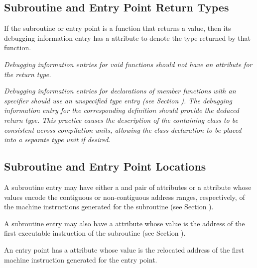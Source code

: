 \subsection{Subroutine and Entry Point Return Types}
\label{chap:subroutineandentrypointreturntypes}

If\hypertarget{chap:DWATtypetypeofsubroutinereturn}{}
the subroutine or entry point
is a function that returns a
value, then its debugging information entry has
a \DWATtypeDEFN{} attribute
to denote the type returned by that function.

\textit{Debugging information entries for
 void functions should
not have an attribute for the return type.  }

\textit{Debugging information entries for declarations of 
member functions with an
\autoreturntype{} specifier should use an unspecified type entry (see
Section ).
The debugging information entry for the corresponding definition
should provide the deduced return type.  This practice causes the description of
the containing class to be consistent across compilation units, allowing the class
declaration to be placed into a separate type unit if desired.}


\subsection{Subroutine and Entry Point Locations}
\label{chap:subroutineandentrypointlocations}

A subroutine entry may have either a \DWATlowpc{} and
\DWAThighpc{} pair of attributes or a \DWATranges{} attribute
whose
values
encode the contiguous or non-contiguous address
ranges, respectively, of the machine instructions generated
for the subroutine (see
Section ).

A\hypertarget{chap:DWATentrypcentryaddressofsubprogram}{}
subroutine entry may also have a
\DWATentrypc{} attribute
whose value is the address of the first executable instruction
of the subroutine (see
Section ).

An entry point has a \DWATlowpc{} attribute whose value is the
relocated address of the first machine instruction generated
for the entry point.

